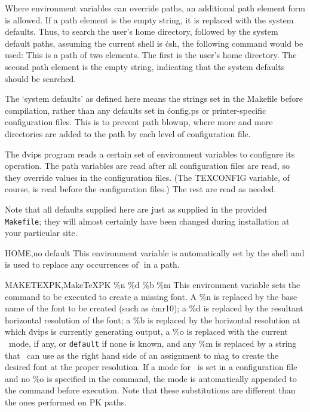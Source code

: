 Where environment variables can override paths, an additional path
element form is allowed.  If a path element is the empty string, it
is replaced with the system defaults.  Thus, to
search the user's home directory, followed by the system
default paths, assuming the current shell is \.{csh},
the following command would be used:
\noindent
This is a path of two elements.  The first is the user's home directory.
The second path element is the empty string, indicating that
the system defaults should be searched.

The `system defaults' as defined here means the strings set in the
\.{Makefile} before compilation, rather than any defaults set in
\.{config.ps} or printer-specific configuration files.  This is to
prevent path blowup, where more and more directories are added to the
path by each level of configuration file.


The \.{dvips} program reads a certain set of environment variables to
configure its operation.  The path variables are read after all
configuration files are read, so they override values in the configuration
files.  (The \.{TEXCONFIG} variable, of course, is read before the
configuration files.)  The rest are read as needed.

Note that all defaults supplied here are just as supplied in the
provided {\tt Makefile}; they will almost certainly have been changed
during installation at your particular site.

\descenv HOME,{\rm no default}
  This environment variable is automatically set by the shell and is
used to replace any occurrences of \.{\tilde} in a path.

\descenv MAKETEXPK,{MakeTeXPK \%n \%d \%b \%m}
This environment variable sets the command to be executed to create
a missing font.  A \%n is replaced by the base name of the font to
be created (such as \.{cmr10}); a \%d is replaced by the resultant
horizontal resolution of the font; a \%b is replaced by the
horizontal resolution at which \.{dvips} is currently generating
output, a \%o is replaced with the current \MF\ mode, if any,
or {\tt default} if none is known,
and any \%m is replaced by a string that \MF\ can use as
the right hand side of an assignment to \.{mag} to create the
desired font at the proper resolution.  If a mode for \MF\ is set in
a configuration file and no \%o is specified in the command,
the mode is automatically appended to the command
before execution.  Note that these substitutions are different than
the ones performed on PK paths.

